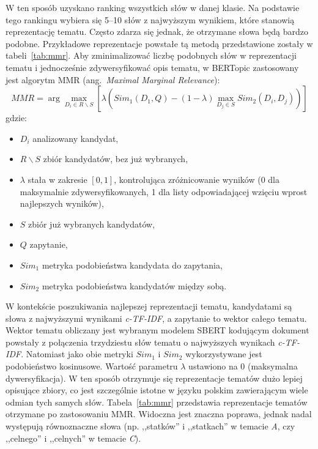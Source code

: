 	W ten sposób uzyskano ranking wszystkich słów w danej klasie.
	Na podstawie tego rankingu wybiera się 5--10 słów z najwyższym wynikiem, które stanowią reprezentację tematu.
	Często zdarza się jednak, że otrzymane słowa będą bardzo podobne.
	Przykładowe reprezentacje powstałe tą metodą przedstawione zostały w tabeli~\ref{tab:mmr}.
	Aby zminimalizować liczbę podobnych słów w reprezentacji tematu i jednocześnie zdywersyfikować opis tematu,
		w BERTopic zastosowany jest algorytm MMR (ang.\ \emph{Maximal Marginal Relevance})\cite{MMR}:
	\[MMR = \arg \max_{D_i \in R\backslash S} \left[\lambda\left(Sim_1(D_1, Q) - (1-\lambda) \max_{D_j \in S} Sim_2(D_i, D_j)\right)\right]\]
	gdzie:
	\begin{itemize}
		\item \(D_i\) analizowany kandydat,
		\item \(R\backslash S\) zbiór kandydatów, bez już wybranych,
		\item \(\lambda\) stała w zakresie \(\left[0,1\right]\), kontrolująca zróżnicowanie wyników (0 dla maksymalnie zdywersyfikowanych, 1 dla listy odpowiadającej wzięciu wprost najlepszych wyników),
		\item \(S\) zbiór już wybranych kandydatów,
		\item \(Q\) zapytanie,
		\item \(Sim_1\) metryka podobieństwa kandydata do zapytania,
		\item \(Sim_2\) metryka podobieństwa kandydatów między sobą.
	\end{itemize}
	W kontekście poszukiwania najlepszej reprezentacji tematu, kandydatami są słowa z najwyższymi wynikami \emph{c-TF-IDF}, a zapytanie to wektor całego tematu.
	Wektor tematu obliczany jest wybranym modelem SBERT kodującym dokument powstały z połączenia trzydziestu słów tematu o najwyższych wynikach \emph{c-TF-IDF}.
	Natomiast jako obie metryki \(Sim_1\) i \(Sim_2\) wykorzystywane jest podobieństwo kosinusowe.
	Wartość parametru \(\lambda\) ustawiono na 0 (maksymalna dywersyfikacja).
	W ten sposób otrzymuje się reprezentacje tematów dużo lepiej opisujące zbiory,
		co jest szczególnie istotne w języku polskim zawierającym wiele odmian tych samych słów.
	Tabela~\ref{tab:mmr} przedstawia reprezentacje tematów otrzymane po zastosowaniu MMR\@.
	Widoczna jest znaczna poprawa, jednak nadal występują równoznaczne słowa (np. ,,statków'' i ,,statkach'' w temacie \emph{A}, czy ,,celnego'' i ,,celnych'' w temacie \emph{C}).


